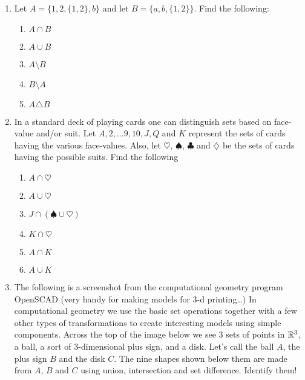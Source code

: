 \begin{enumerate}
\item Let $A = \{1, 2, \{1, 2\}, b\}$ and let $B=\{a, b, \{1, 2\} \}$.
Find the following:
  \begin{enumerate}
  \item \wbitemsep $A \cap B$   
  \item \wbitemsep $A \cup B$ 
  \item \wbitemsep $A \setminus B$ 
  \item \wbitemsep $B \setminus A$ 
  \item \wbitemsep $A \triangle B$ 
  \end{enumerate}

\vfill


\workbookpagebreak

\item In a standard deck of playing cards one can distinguish sets
based on face-value and/or suit.  Let $A, 2, \ldots 9, 10, J, Q$ and $K$
represent the sets of cards having the various face-values.  Also, let
$\heartsuit$, $\spadesuit$, $\clubsuit$ and $\diamondsuit$ be the 
sets of cards having the possible suits.  Find the following
  \begin{enumerate}
  \item \wbitemsep$A \cap \heartsuit$ 
  \item \wbitemsep$A \cup \heartsuit$ 
  \item \wbitemsep$J \cap (\spadesuit \cup \heartsuit)$ 
  \item \wbitemsep$K \cap \heartsuit$ 
  \item \wbitemsep$A \cap K$ \hint{$\emptyset$ }
  \item \wbitemsep$A \cup K$ 
  \end{enumerate}

\vfill


\pagebreak

\item The following is a screenshot from the computational geometry program OpenSCAD (very handy for making models for 3-d printing\ldots)  In computational geometry we use the basic set operations together
with a few other types of transformations to create interesting models using simple components.  Across the top of the image below we see 3 sets of points in ${\mathbb R}^3$, a ball, a sort of 3-dimensional plus sign, and a disk.  Let's call the ball $A$, the plus sign $B$ and the disk $C$.   The nine shapes shown below them are made from $A$, $B$ and $C$ using union, intersection and set difference.  Identify them!


\end{enumerate}
